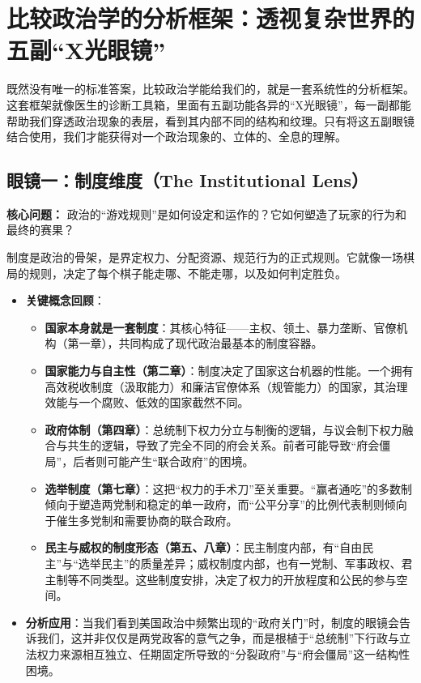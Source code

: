 \section{比较政治学的分析框架：透视复杂世界的五副“X光眼镜”}

既然没有唯一的标准答案，比较政治学能给我们的，就是一套系统性的分析框架。这套框架就像医生的诊断工具箱，里面有五副功能各异的“X光眼镜”，每一副都能帮助我们穿透政治现象的表层，看到其内部不同的结构和纹理。只有将这五副眼镜结合使用，我们才能获得对一个政治现象的、立体的、全息的理解。

\subsection{眼镜一：制度维度（The Institutional Lens）}
\textbf{核心问题：} 政治的“游戏规则”是如何设定和运作的？它如何塑造了玩家的行为和最终的赛果？

制度是政治的骨架，是界定权力、分配资源、规范行为的正式规则。它就像一场棋局的规则，决定了每个棋子能走哪、不能走哪，以及如何判定胜负。
\begin{itemize}
    \item \textbf{关键概念回顾}：
    \begin{itemize}
        \item \textbf{国家本身就是一套制度}：其核心特征——主权、领土、暴力垄断、官僚机构（第一章），共同构成了现代政治最基本的制度容器。
        \item \textbf{国家能力与自主性（第二章）}：制度决定了国家这台机器的性能。一个拥有高效税收制度（汲取能力）和廉洁官僚体系（规管能力）的国家，其治理效能与一个腐败、低效的国家截然不同。
        \item \textbf{政府体制（第四章）}：总统制下权力分立与制衡的逻辑，与议会制下权力融合与共生的逻辑，导致了完全不同的府会关系。前者可能导致“府会僵局”，后者则可能产生“联合政府”的困境。
        \item \textbf{选举制度（第七章）}：这把“权力的手术刀”至关重要。“赢者通吃”的多数制倾向于塑造两党制和稳定的单一政府，而“公平分享”的比例代表制则倾向于催生多党制和需要协商的联合政府。
        \item \textbf{民主与威权的制度形态（第五、八章）}：民主制度内部，有“自由民主”与“选举民主”的质量差异；威权制度内部，也有一党制、军事政权、君主制等不同类型。这些制度安排，决定了权力的开放程度和公民的参与空间。
    \end{itemize}
    \item \textbf{分析应用}：当我们看到美国政治中频繁出现的“政府关门”时，制度的眼镜会告诉我们，这并非仅仅是两党政客的意气之争，而是根植于“总统制”下行政与立法权力来源相互独立、任期固定所导致的“分裂政府”与“府会僵局”这一结构性困境。
\end{itemize}

